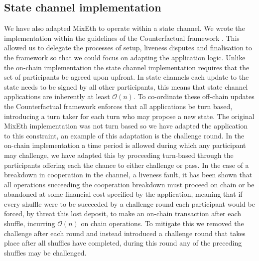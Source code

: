 \documentclass[a4paper]{article}
\theoremstyle{definition}
\begin{document}
\subsection{State channel implementation} \label{statechannelimpl}

We have also adapted MixEth to operate within a state channel. We wrote the implementation within the guidelines of the Counterfactual framework \cite{coleman2018counterfactual}. This allowed us to delegate the processes of setup, liveness disputes and finalisation to the framework so that we could focus on adapting the application logic. Unlike the on-chain implementation the state channel implementation requires that the set of participants be agreed upon upfront. In state channels each update to the state needs to be signed by all other participants, this means that state channel applications are inherently at least $\mathcal{O}(n)$. To co-ordinate these off-chain updates the Counterfactual framework enforces that all applications be turn based, introducing a turn taker for each turn who may propose a new state. The original MixEth implementation was not turn based so we have adapted the application to this constraint, an example of this adaptation is the challenge round. In the on-chain implementation a time period is allowed during which any participant may challenge, we have adapted this by proceeding turn-based through the participants offering each the chance to either challenge or pass. In the case of a breakdown in cooperation in the channel, a liveness fault, it has been shown that all operations succeeding the cooperation breakdown must proceed on chain\cite{mccorryyou} or be abandoned at some financial cost specified by the application, meaning that if every shuffle were to be succeeded by a challenge round each participant would be forced, by threat this lost deposit, to make an on-chain transaction after each shuffle, incurring $\mathcal{O}(n)$ on chain operations. To mitigate this we removed the challenge after each round and instead introduced a challenge round that takes place after all shuffles have completed, during this round any of the preceding shuffles may be challenged.
\end{document}
